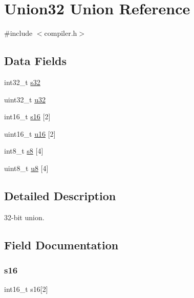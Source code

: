 \hypertarget{union_union32}{}\section{Union32 Union Reference}
\label{union_union32}


{\ttfamily \#include $<$compiler.\+h$>$}

\subsection*{Data Fields}
\begin{DoxyCompactItemize}
\item 
int32\+\_\+t \mbox{\hyperlink{union_union32_acd1420e45b5486795a46cf1a5943a0ff}{s32}}
\item 
uint32\+\_\+t \mbox{\hyperlink{union_union32_ae65af0c4a8ee050043fe4b575f0a26a0}{u32}}
\item 
int16\+\_\+t \mbox{\hyperlink{union_union32_a3f5722c80472f0ced409f9d7ebedf295}{s16}} \mbox{[}2\mbox{]}
\item 
uint16\+\_\+t \mbox{\hyperlink{union_union32_a3afd84b866f8cca1b10c0fa139028c96}{u16}} \mbox{[}2\mbox{]}
\item 
int8\+\_\+t \mbox{\hyperlink{union_union32_a77e1b7a79d4140f7c79c9d77f2a5068b}{s8}} \mbox{[}4\mbox{]}
\item 
uint8\+\_\+t \mbox{\hyperlink{union_union32_a4dacc7e50619978e3e003e36ec24e302}{u8}} \mbox{[}4\mbox{]}
\end{DoxyCompactItemize}


\subsection{Detailed Description}
32-\/bit union. 

\subsection{Field Documentation}
\mbox{\label{union_union32_a3f5722c80472f0ced409f9d7ebedf295}} 
\subsubsection{\texorpdfstring{s16}{s16}}
{\footnotesize\ttfamily int16\+\_\+t s16\mbox{[}2\mbox{]}}

\mbox{\label{union_union32_acd1420e45b5486795a46cf1a5943a0ff}} 
